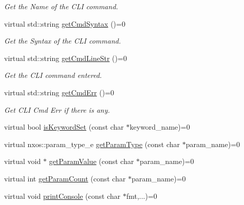 \begin{DoxyCompactItemize}
\begin{DoxyCompactList}\small\item\em Get the Name of the CLI command. \item\end{DoxyCompactList}\item 
\hypertarget{classnxos_1_1NxCliCmd_a0568d5404d91ddb89135e632e05d7abe}{
virtual std::string \hyperlink{classnxos_1_1NxCliCmd_a0568d5404d91ddb89135e632e05d7abe}{getCmdSyntax} ()=0}
\label{classnxos_1_1NxCliCmd_a0568d5404d91ddb89135e632e05d7abe}

\begin{DoxyCompactList}\small\item\em Get the Syntax of the CLI command. \item\end{DoxyCompactList}\item 
\hypertarget{classnxos_1_1NxCliCmd_a3d856a7d4350f027df53960053901c96}{
virtual std::string \hyperlink{classnxos_1_1NxCliCmd_a3d856a7d4350f027df53960053901c96}{getCmdLineStr} ()=0}
\label{classnxos_1_1NxCliCmd_a3d856a7d4350f027df53960053901c96}

\begin{DoxyCompactList}\small\item\em Get the CLI command entered. \item\end{DoxyCompactList}\item 
\hypertarget{classnxos_1_1NxCliCmd_aa4321d9b60ecb1366157d0ef9356ffbf}{
virtual std::string \hyperlink{classnxos_1_1NxCliCmd_aa4321d9b60ecb1366157d0ef9356ffbf}{getCmdErr} ()=0}
\label{classnxos_1_1NxCliCmd_aa4321d9b60ecb1366157d0ef9356ffbf}

\begin{DoxyCompactList}\small\item\em Get CLI Cmd Err if there is any. \item\end{DoxyCompactList}\item 
virtual bool \hyperlink{classnxos_1_1NxCliCmd_af100c6495c0e383c8e3d11d5cdb68cd2}{isKeywordSet} (const char $\ast$keyword\_\-name)=0
\item 
virtual nxos::param\_\-type\_\-e \hyperlink{classnxos_1_1NxCliCmd_ab3722b567439f8ebd6422a5727bb7af6}{getParamType} (const char $\ast$param\_\-name)=0
\item 
virtual void $\ast$ \hyperlink{classnxos_1_1NxCliCmd_a4d15b397304c3499c5dbae8ef9210ad1}{getParamValue} (const char $\ast$param\_\-name)=0
\item 
virtual int \hyperlink{classnxos_1_1NxCliCmd_a12e56ced4646ba1a27417030c0d20e7b}{getParamCount} (const char $\ast$param\_\-name)=0
\item 
virtual void \hyperlink{classnxos_1_1NxCliCmd_a10c723c79d75ac2c85821b5ca6540c62}{printConsole} (const char $\ast$fmt,...)=0
\end{DoxyCompactItemize}


